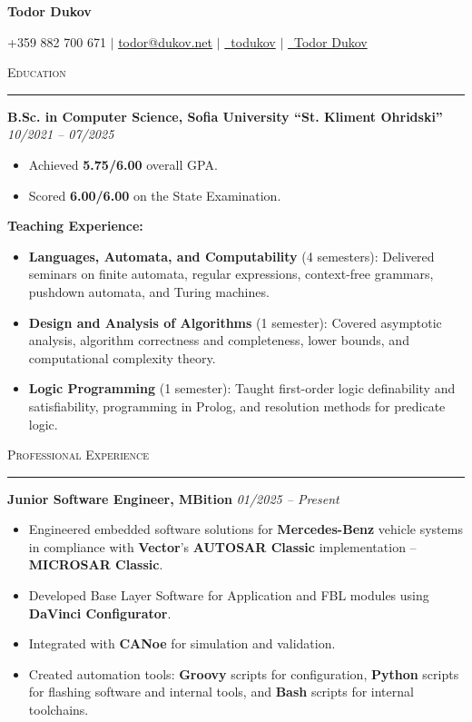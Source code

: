 \documentclass[a4paper,10pt]{article}
\newcommand{\textwithhr}[1]{
\textsc{#1}

\vspace{1mm}
\hrule \hfill
}
\begin{document}
\begin{center}
    \huge{\textbf{Todor Dukov}}

    \normalsize{+359 882 700 671 $\mid$ \href{mailto:todor@dukov.net}{todor@dukov.net} $\mid$ \href{https://github.com/toduko}{\faGithubSquare \, todukov} $\mid$ \href{https://www.linkedin.com/in/todor-dukov}{\faLinkedinSquare \, Todor Dukov}}
\end{center}

\textwithhr{Education}

\vspace{3mm}

\textbf{B.Sc. in Computer Science, Sofia University “St. Kliment Ohridski”} \hspace*{\fill} \textit{10/2021 -- 07/2025}

\begin{itemize}
    \item Achieved \textbf{5.75/6.00} overall GPA.
    \item Scored \textbf{6.00/6.00} on the State Examination.
\end{itemize}

\textbf{Teaching Experience:}
\begin{itemize}
  \item \textbf{Languages, Automata, and Computability} (4 semesters):  
        Delivered seminars on finite automata, regular expressions, context-free grammars, pushdown automata, and Turing machines.
  \item \textbf{Design and Analysis of Algorithms} (1 semester):  
        Covered asymptotic analysis, algorithm correctness and completeness, lower bounds, and computational complexity theory.
  \item \textbf{Logic Programming} (1 semester):  
        Taught first-order logic definability and satisfiability, programming in Prolog, and resolution methods for predicate logic.
\end{itemize}

\textwithhr{Professional Experience}

\vspace{3mm}

\textbf{Junior Software Engineer, MBition} \hspace*{\fill} \textit{01/2025 -- Present}
\begin{itemize}
\item Engineered embedded software solutions for \textbf{Mercedes-Benz} vehicle systems in compliance with \textbf{Vector}'s \textbf{AUTOSAR Classic} implementation -- \textbf{MICROSAR Classic}.
    \item Developed Base Layer Software for Application and FBL modules using \textbf{DaVinci Configurator}.
    \item Integrated with \textbf{CANoe} for simulation and validation.
    \item Created automation tools: \textbf{Groovy} scripts for configuration, \textbf{Python} scripts for flashing software and internal tools, and \textbf{Bash} scripts for internal toolchains.
\end{itemize}
\end{document}
